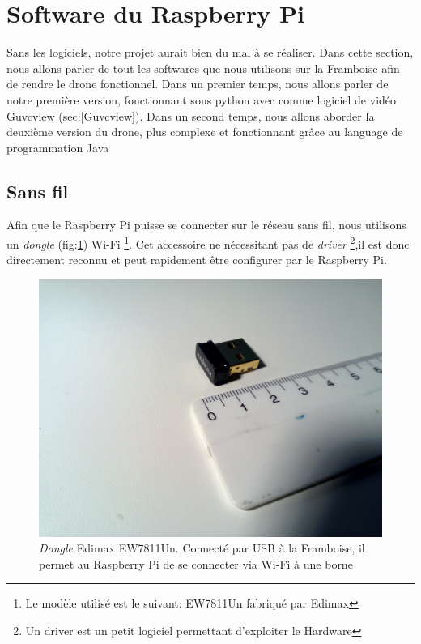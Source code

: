 \documentclass[a4paper,11pt]{report}
\begin{document}
{\section{Software du Raspberry Pi}
Sans les logiciels, notre projet aurait bien du mal à se réaliser. Dans cette section, nous allons parler de tout les softwares que nous utilisons sur la Framboise afin de rendre le drone fonctionnel. Dans un premier temps, nous allons parler de notre première version, fonctionnant sous python avec comme logiciel de vidéo Guvcview (sec:\ref{Guvcview}). Dans un second temps, nous allons aborder la deuxième version du drone, plus complexe et fonctionnant grâce au language de programmation Java





\subsection{Sans fil}

Afin que le Raspberry Pi puisse se connecter sur le réseau sans fil, nous utilisons un \textit{dongle} (fig:\ref{Edimax}) Wi-Fi \footnote{Le modèle utilisé est le suivant: EW7811Un fabriqué par Edimax}. Cet accessoire ne nécessitant pas de \textit{driver} \footnote{Un driver est un petit logiciel permettant d'exploiter le Hardware},il est donc directement reconnu et peut rapidement être configurer par le Raspberry Pi. 
\begin{figure}[!h]
\begin{center}
\includegraphics[scale=0.38, trim=300 300 300 0, clip=true]{Edimax}
\caption{\textit{Dongle} Edimax EW7811Un. Connecté par USB à la Framboise, il permet au Raspberry Pi de se connecter via Wi-Fi à une borne\label{Edimax}}
\end{center}
\end{figure} 

}
\end{document}
